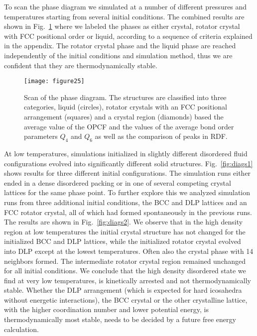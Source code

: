 \documentclass[10pt,aps,pre,twocolumn,superscriptaddress,amsmath,amssymb]{revtex4-1}
\begin{document}
To scan the phase diagram we simulated at a number of different pressures and temperatures starting from several initial conditions.
The combined results are shown in Fig.~\ref{fig:diag1} where we labeled the phases as either crystal, rotator crystal with FCC positional order or liquid, according to a sequence of criteria explained in the appendix. The rotator crystal phase and the liquid phase are reached independently of the initial conditions and simulation method, thus we are confident that they are thermodynamically stable.

\begin{figure}
  \centering
  \texttt{[image: figure25]}
  \caption{Scan of the phase diagram. The structures are classified into three categories, liquid (circles), rotator crystals with an FCC positional arrangement (squares) and a crystal region (diamonds) based the average value of the OPCF and the values of the average bond order parameters $Q_4$ and $Q_6$ as well as the comparison of peaks in RDF.}
  \label{fig:diag1}
\end{figure}

At low temperatures, simulations initialized in slightly different disordered fluid configurations evolved into significantly different solid structures.
Fig.~\ref{fig:diags1} shows results for three different initial configurations. The simulation runs either ended in a dense disordered packing or in one of several competing crystal lattices for the same phase point.
To further explore this we analyzed simulation runs from three additional initial conditions, the BCC and DLP lattices and an FCC rotator crystal, all of which had formed spontaneously in the previous runs.
The results are shown in Fig.~\ref{fig:diags2}. We observe that in the high density region at low temperatures the initial crystal structure has not changed for the initialized BCC and DLP lattices, while the initialized rotator crystal evolved into DLP except at the lowest temperatures. Often also the crystal phase with 14 neighbors formed.
The intermediate rotator crystal region remained unchanged for all initial conditions. We conclude that the high density disordered state we find at very low temperatures, is kinetically arrested and not thermodynamically stable. Whether the DLP arrangement (which is expected for hard icosahedra without energetic interactions), the BCC crystal or the other crystalline lattice, with the higher coordination number and lower potential energy, is thermodynamically most stable, needs to be decided by a future free energy calculation.
\end{document}
